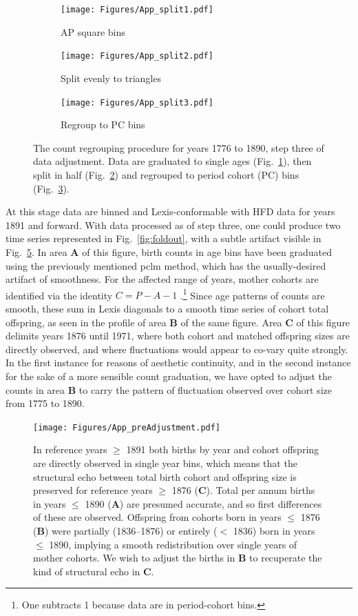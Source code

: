 \documentclass{article}
\begin{document}
\begin{appendix}
\begin{figure}[ht!]
\centering
\begin{subfigure}{.3\textwidth}
  \centering
  \texttt{[image: Figures/App\_split1.pdf]}
  \caption{AP square bins}
  \label{fig:app1}
\end{subfigure}%
\begin{subfigure}{.3\textwidth}
  \centering
  \texttt{[image: Figures/App\_split2.pdf]}
  \caption{Split evenly to triangles}
  \label{fig:app2}
\end{subfigure}
\begin{subfigure}{.3\textwidth}
  \centering
  \texttt{[image: Figures/App\_split3.pdf]}
  \caption{Regroup to PC bins}
  \label{fig:app3}
\end{subfigure}
\caption{The count regrouping procedure for years 1776 to 1890, step three of data adjustment. Data are graduated to single ages (Fig.~\ref{fig:app1}), then split in half (Fig.~\ref{fig:app2}) and regrouped to period cohort (PC) bins (Fig.~\ref{fig:app3}).}
\label{fig:AP2PC}
\end{figure}
At this stage data are binned and Lexis-conformable with HFD data for years 1891 and forward. With data processed as of step three, one could produce two time series represented in Fig.~\ref{fig:foldout}, with a subtle artifact visible in Fig.~\ref{fig:toosmooth}. In area \textbf{A} of this figure, birth counts in age bins have been graduated using the previously mentioned pclm method, which has the usually-desired artifact of smoothness. For the affected range of years, mother cohorts are identified via the identity $C = P - A - 1$ .\footnote{One subtracts 1 because data are in period-cohort bins.} Since age patterns of counts are smooth, these sum in Lexis diagonals to a smooth time series of cohort total offspring, as seen in the profile of area \textbf{B} of the same figure. Area \textbf{C} of this figure delimits years 1876 until 1971, where both cohort and matched offspring sizes are directly observed, and where fluctuations would appear to co-vary quite strongly. In the first instance for reasons of aesthetic continuity, and in the second instance for the sake of a more sensible count graduation, we have opted to adjust the counts in area \textbf{B} to carry the pattern of fluctuation observed over cohort size from 1775 to 1890.

\begin{figure}[ht!]
\centering
 \texttt{[image: Figures/App\_preAdjustment.pdf]}
\caption{In reference years $\ge$ 1891 both births by year and cohort offspring are directly observed in single year bins, which means that the structural echo between total birth cohort and offspring size is preserved for reference years $\ge$ 1876  (\textbf{C}). Total per annum births in years $\le$ 1890 (\textbf{A}) are presumed accurate, and so first differences of these are observed. Offspring from cohorts born in years $\le$ 1876 (\textbf{B}) were partially (1836--1876) or entirely ($<$ 1836) born in years $\le$ 1890, implying a smooth redistribution over single years of mother cohorts. We wish to adjust the births in \textbf{B} to recuperate the kind of structural echo in \textbf{C}.}
\label{fig:toosmooth}
\end{figure}


\end{appendix}
\end{document}
